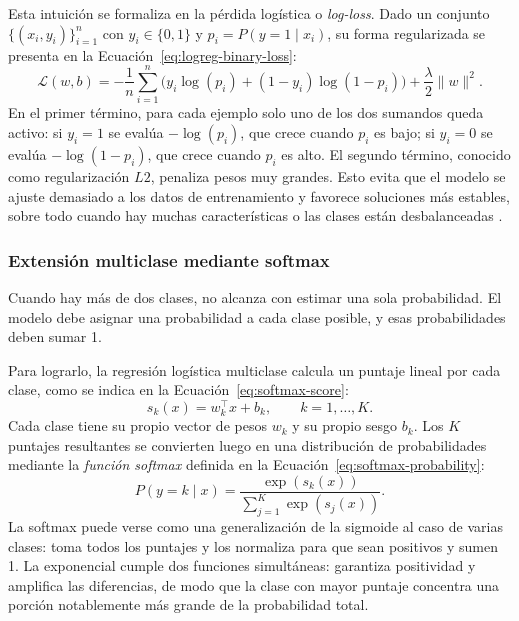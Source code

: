 \documentclass[12pt,oneside]{report}
\begin{document}
Esta intuición se formaliza en la pérdida logística o \textit{log-loss}.
Dado un conjunto $\{(x_i,y_i)\}_{i=1}^n$ con $y_i\in\{0,1\}$ y
$p_i=P(y=1\mid x_i)$, su forma regularizada se presenta en la Ecuación~\eqref{eq:logreg-binary-loss}:
\begin{equation}
\label{eq:logreg-binary-loss}
\mathcal{L}(w,b)=
-\frac{1}{n}\sum_{i=1}^n
\Big(y_i\log(p_i) + (1-y_i)\log(1-p_i)\Big)
+ \frac{\lambda}{2}\lVert w\rVert^2.
\end{equation}
En el primer término, para cada ejemplo solo uno de los dos sumandos queda
activo: si $y_i=1$ se evalúa $-\log(p_i)$, que crece cuando $p_i$ es bajo;
si $y_i=0$ se evalúa $-\log(1-p_i)$, que crece cuando $p_i$ es alto. El
segundo término, conocido como regularización $L2$, penaliza pesos muy
grandes. Esto evita que el modelo se ajuste demasiado a los datos de
entrenamiento y favorece soluciones más estables, sobre todo cuando hay
muchas características o las clases están desbalanceadas
\cite{islr_logreg,sklearn_logreg}.

\subsubsection{Extensión multiclase mediante softmax}

Cuando hay más de dos clases, no alcanza con estimar una sola probabilidad.
El modelo debe asignar una probabilidad a cada clase posible, y esas
probabilidades deben sumar 1.

Para lograrlo, la regresión logística multiclase calcula un puntaje lineal
por cada clase, como se indica en la Ecuación~\eqref{eq:softmax-score}:
\begin{equation}
\label{eq:softmax-score}
s_k(x)=w_k^\top x + b_k, \qquad k=1,\dots,K.
\end{equation}
Cada clase tiene su propio vector de pesos $w_k$ y su propio sesgo $b_k$.
Los $K$ puntajes resultantes se convierten luego en una distribución de
probabilidades mediante la \textit{función softmax} definida en la Ecuación~\eqref{eq:softmax-probability}:
\begin{equation}
\label{eq:softmax-probability}
P(y=k\mid x)=\frac{\exp(s_k(x))}{\sum_{j=1}^K \exp(s_j(x))}.
\end{equation}
La softmax puede verse como una generalización de la sigmoide al caso de
varias clases: toma todos los puntajes y los normaliza para que sean
positivos y sumen 1. La exponencial cumple dos funciones simultáneas:
garantiza positividad y amplifica las diferencias, de modo que la clase con
mayor puntaje concentra una porción notablemente más grande de la
probabilidad total.
\end{document}
